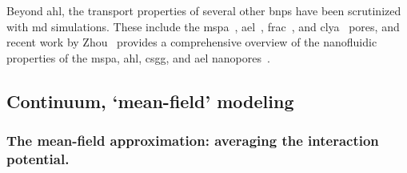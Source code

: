Beyond \gls{ahl}, the transport properties of several other \glspl{bnp} have been scrutinized with \gls{md}
simulations. These include the \gls{mspa}~\cite{Bhattacharya-2012,Manara-2015,Bhattacharya-2016,Zhou-2020},
\gls{ael}~\cite{Cao-2018,Ouldali-2020,Zhou-2020}, \gls{frac}~\cite{Zhao-2019}, and
\gls{clya}~\cite{Mandal-2016,Wilson-2019,Li-2020} pores, and recent work by Zhou~\etal{} provides a
comprehensive overview of the nanofluidic properties of the \gls{mspa}, \gls{ahl}, \gls{csgg}, and \gls{ael}
nanopores~\cite{Zhou-2020}.





\subsection{Continuum, `mean-field' modeling}
%

\subsubsection{The mean-field approximation: averaging the interaction potential.}
%

